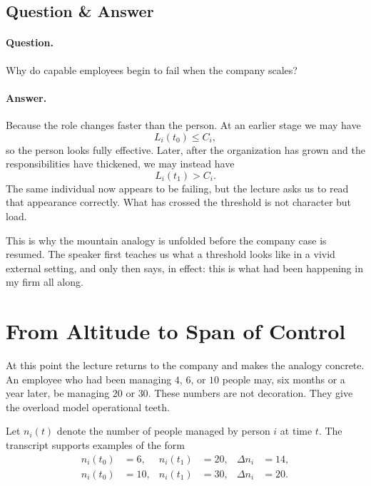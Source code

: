 \subsection{Question \& Answer}

\paragraph{Question.} Why do capable employees begin to fail when the company scales?

\paragraph{Answer.} Because the role changes faster than the person. At an earlier stage we may have
\begin{equation}
L_i(t_0) \le C_i,
\end{equation}
so the person looks fully effective. Later, after the organization has grown and the responsibilities have thickened, we may instead have
\begin{equation}
L_i(t_1) > C_i.
\end{equation}
The same individual now appears to be failing, but the lecture asks us to read that appearance correctly. What has crossed the threshold is not character but load.

This is why the mountain analogy is unfolded before the company case is resumed. The speaker first teaches us what a threshold looks like in a vivid external setting, and only then says, in effect: this is what had been happening in my firm all along.

\section{From Altitude to Span of Control}

At this point the lecture returns to the company and makes the analogy concrete. An employee who had been managing \(4\), \(6\), or \(10\) people may, six months or a year later, be managing \(20\) or \(30\). These numbers are not decoration. They give the overload model operational teeth.

Let \(n_i(t)\) denote the number of people managed by person \(i\) at time \(t\). The transcript supports examples of the form
\begin{align}
n_i(t_0) &= 6,  & n_i(t_1) &= 20, & \Delta n_i &= 14, \\
n_i(t_0) &= 10, & n_i(t_1) &= 30, & \Delta n_i &= 20.
\end{align}


